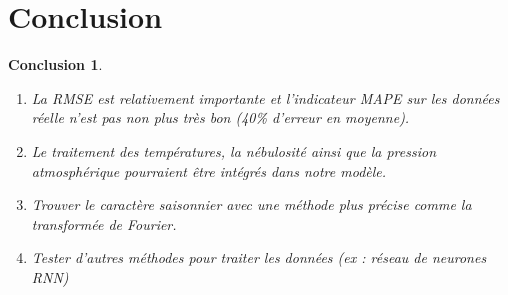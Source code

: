 \documentclass{beamer}
\newtheorem{con}{Conclusion}
\theoremstyle{definition}
\begin{document}
\section{Conclusion}

\begin{frame}
\begin{con}
	\begin{enumerate}
		\item La RMSE est relativement importante et l'indicateur MAPE sur les données réelle n'est pas non plus très bon (40\% d'erreur en moyenne).
		\item Le traitement des températures, la nébulosité ainsi que la pression atmosphérique pourraient être intégrés dans notre modèle.
		\item Trouver le caractère saisonnier avec une méthode plus précise comme la transformée de Fourier.
		\item Tester d'autres méthodes pour traiter les données (ex : réseau de neurones RNN)
	\end{enumerate}
\end{con}
		
\end{frame}
\end{document}
